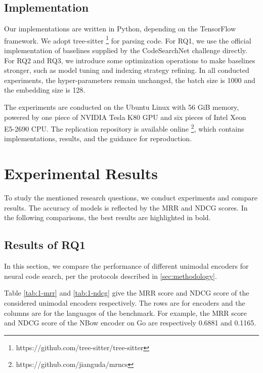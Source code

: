 \documentclass[conference]{IEEEtran}
\begin{document}
\subsection{Implementation}

Our implementations are written in Python, depending on the TensorFlow \cite{Abadi2016TensorFlowAS} framework. We adopt tree-sitter \footnote{https://github.com/tree-sitter/tree-sitter} for parsing code. For RQ1, we use the official implementation of baselines supplied by the CodeSearchNet challenge directly. For RQ2 and RQ3, we introduce some optimization operations to make baselines stronger, such as model tuning and indexing strategy refining. In all conducted experiments, the hyper-parameters remain unchanged, the batch size is 1000 and the embedding size is 128.

The experiments are conducted on the Ubuntu Linux with 56 GiB memory, powered by one piece of NVIDIA Tesla K80 GPU and six pieces of Intel Xeon E5-2690 CPU. The replication repository is available online \footnote{https://github.com/jianguda/mrncs}, which contains implementations, results, and the guidance for reproduction.
 \section{Experimental Results}
\label{sec:results}

To study the mentioned research questions, we conduct experiments and compare results. The accuracy of models is reflected by the MRR and NDCG scores. In the following comparisons, the best results are highlighted in bold.


\subsection{Results of RQ1}

In this section, we compare the performance of different unimodal encoders for neural code search, per the protocols described in \autoref{sec:methodology}.

Table \ref{tab:1-mrr} and \ref{tab:1-ndcg} give the MRR score and NDCG score of the considered unimodal encoders respectively. The rows are for encoders and the columns are for the languages of the benchmark. For example, the MRR score and NDCG score of the NBow encoder on Go are respectively 0.6881 and 0.1165.
\end{document}

